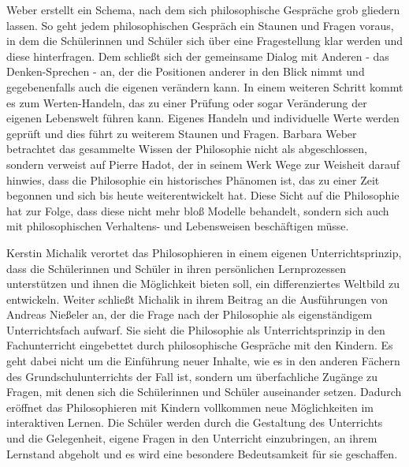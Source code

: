 Weber erstellt ein Schema, nach dem sich philosophische Gespräche grob gliedern lassen. 
So geht jedem philosophischen Gespräch ein Staunen und Fragen voraus, in dem die Schülerinnen und Schüler sich über eine Fragestellung klar werden und diese hinterfragen. 
Dem schließt sich der gemeinsame Dialog mit Anderen - das Denken-Sprechen - an, der die Positionen anderer in den Blick nimmt und gegebenenfalls auch die eigenen verändern kann. 
In einem weiteren Schritt kommt es zum Werten-Handeln, das zu einer Prüfung oder sogar Veränderung der eigenen Lebenswelt führen kann. 
Eigenes Handeln und individuelle Werte werden geprüft und dies führt zu weiterem Staunen und Fragen\cite[S.\,626]{BW13}.
Barbara Weber betrachtet das gesammelte Wissen der Philosophie nicht als abgeschlossen, sondern verweist auf Pierre Hadot, der in seinem Werk \glqq Wege zur Weisheit\grqq{} darauf hinwies, dass \glqq die Philosophie ein historisches Phänomen ist, das zu einer Zeit begonnen und sich bis heute weiterentwickelt hat.\grqq{}
Diese Sicht auf die Philosophie hat zur Folge, dass diese nicht mehr bloß Modelle behandelt, sondern sich auch mit philosophischen Verhaltens- und Lebensweisen beschäftigen müsse.

Kerstin Michalik verortet das Philosophieren in einem eigenen Unterrichtsprinzip, dass die Schülerinnen und Schüler in ihren persönlichen Lernprozessen unterstützen und ihnen die Möglichkeit bieten soll, ein differenziertes Weltbild zu entwickeln\cite[S.\,635]{KM13}. 
Weiter schließt Michalik in ihrem Beitrag an die Ausführungen von Andreas Nießeler an, der die Frage nach der Philosophie als eigenständigem Unterrichtsfach aufwarf. 
Sie sieht die Philosophie als Unterrichtsprinzip in den Fachunterricht eingebettet durch philosophische Gespräche mit den Kindern. 
Es geht dabei nicht um die Einführung neuer Inhalte, wie es in den anderen Fächern des Grundschulunterrichts der Fall ist, sondern um überfachliche Zugänge zu Fragen, mit denen sich die Schülerinnen und Schüler auseinander setzen. 
Dadurch eröffnet das Philosophieren mit Kindern vollkommen neue Möglichkeiten im interaktiven Lernen. 
Die Schüler werden durch die Gestaltung des Unterrichts und die Gelegenheit, eigene Fragen in den Unterricht einzubringen, an ihrem Lernstand abgeholt und es wird eine besondere Bedeutsamkeit für sie geschaffen.

